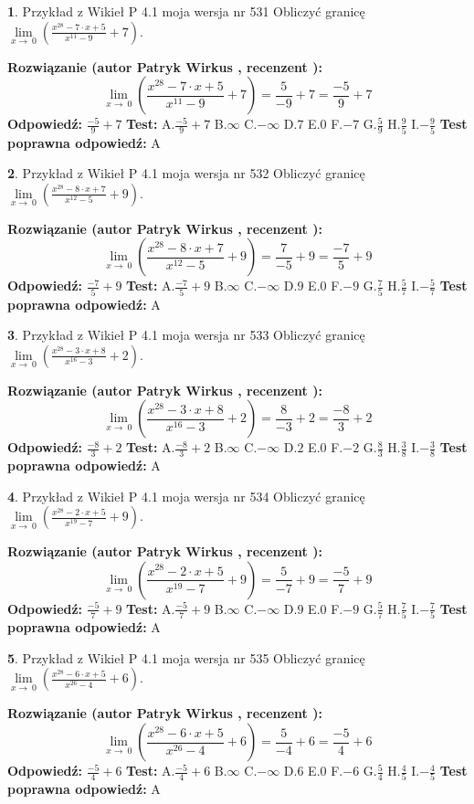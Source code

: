 \documentclass[12pt, a4paper]{article}
\theoremstyle{definition} %
\newtheorem{zad}{}
\newcommand{\zadStart}[1]{\begin{zad}#1\newline}
\newcommand{\zadStop}{\end{zad}}
\newcommand{\rozwStart}[2]{\noindent \textbf{Rozwiązanie (autor #1 , recenzent #2): }\newline}
\newcommand{\rozwStop}{\newline}
\newcommand{\odpStart}{\noindent \textbf{Odpowiedź:}\newline}
\newcommand{\odpStop}{\newline}
\newcommand{\testStart}{\noindent \textbf{Test:}\newline}
\newcommand{\testStop}{\newline}
\newcommand{\kluczStart}{\noindent \textbf{Test poprawna odpowiedź:}\newline}
\newcommand{\kluczStop}{\newline}
\begin{document}
\zadStart{Przykład z Wikieł P 4.1 moja wersja nr 531}
Obliczyć granicę $\lim\limits_{x\to\ 0}(\frac{x^{28}-7 \cdot x +5}{x^{11}-9}+7)$.
\zadStop
\rozwStart{Patryk Wirkus}{}
$$\lim\limits_{x\to\ 0}(\frac{x^{28}-7 \cdot x +5}{x^{11}-9}+7)=\frac{5}{-9}+7=\frac{-5}{9}+7$$
\rozwStop
\odpStart
$\frac{-5}{9}+7$
\odpStop
\testStart
A.$\frac{-5}{9}+7$
B.$\infty$
C.$-\infty$
D.$7$
E.$0$
F.$-7$
G.$\frac{5}{9}$
H.$\frac{9}{5}$
I.$-\frac{9}{5}$
\testStop
\kluczStart
A
\kluczStop



\zadStart{Przykład z Wikieł P 4.1 moja wersja nr 532}
Obliczyć granicę $\lim\limits_{x\to\ 0}(\frac{x^{28}-8 \cdot x +7}{x^{12}-5}+9)$.
\zadStop
\rozwStart{Patryk Wirkus}{}
$$\lim\limits_{x\to\ 0}(\frac{x^{28}-8 \cdot x +7}{x^{12}-5}+9)=\frac{7}{-5}+9=\frac{-7}{5}+9$$
\rozwStop
\odpStart
$\frac{-7}{5}+9$
\odpStop
\testStart
A.$\frac{-7}{5}+9$
B.$\infty$
C.$-\infty$
D.$9$
E.$0$
F.$-9$
G.$\frac{7}{5}$
H.$\frac{5}{7}$
I.$-\frac{5}{7}$
\testStop
\kluczStart
A
\kluczStop



\zadStart{Przykład z Wikieł P 4.1 moja wersja nr 533}
Obliczyć granicę $\lim\limits_{x\to\ 0}(\frac{x^{28}-3 \cdot x +8}{x^{16}-3}+2)$.
\zadStop
\rozwStart{Patryk Wirkus}{}
$$\lim\limits_{x\to\ 0}(\frac{x^{28}-3 \cdot x +8}{x^{16}-3}+2)=\frac{8}{-3}+2=\frac{-8}{3}+2$$
\rozwStop
\odpStart
$\frac{-8}{3}+2$
\odpStop
\testStart
A.$\frac{-8}{3}+2$
B.$\infty$
C.$-\infty$
D.$2$
E.$0$
F.$-2$
G.$\frac{8}{3}$
H.$\frac{3}{8}$
I.$-\frac{3}{8}$
\testStop
\kluczStart
A
\kluczStop



\zadStart{Przykład z Wikieł P 4.1 moja wersja nr 534}
Obliczyć granicę $\lim\limits_{x\to\ 0}(\frac{x^{28}-2 \cdot x +5}{x^{19}-7}+9)$.
\zadStop
\rozwStart{Patryk Wirkus}{}
$$\lim\limits_{x\to\ 0}(\frac{x^{28}-2 \cdot x +5}{x^{19}-7}+9)=\frac{5}{-7}+9=\frac{-5}{7}+9$$
\rozwStop
\odpStart
$\frac{-5}{7}+9$
\odpStop
\testStart
A.$\frac{-5}{7}+9$
B.$\infty$
C.$-\infty$
D.$9$
E.$0$
F.$-9$
G.$\frac{5}{7}$
H.$\frac{7}{5}$
I.$-\frac{7}{5}$
\testStop
\kluczStart
A
\kluczStop



\zadStart{Przykład z Wikieł P 4.1 moja wersja nr 535}
Obliczyć granicę $\lim\limits_{x\to\ 0}(\frac{x^{28}-6 \cdot x +5}{x^{26}-4}+6)$.
\zadStop
\rozwStart{Patryk Wirkus}{}
$$\lim\limits_{x\to\ 0}(\frac{x^{28}-6 \cdot x +5}{x^{26}-4}+6)=\frac{5}{-4}+6=\frac{-5}{4}+6$$
\rozwStop
\odpStart
$\frac{-5}{4}+6$
\odpStop
\testStart
A.$\frac{-5}{4}+6$
B.$\infty$
C.$-\infty$
D.$6$
E.$0$
F.$-6$
G.$\frac{5}{4}$
H.$\frac{4}{5}$
I.$-\frac{4}{5}$
\testStop
\kluczStart
A
\kluczStop
\end{document}
